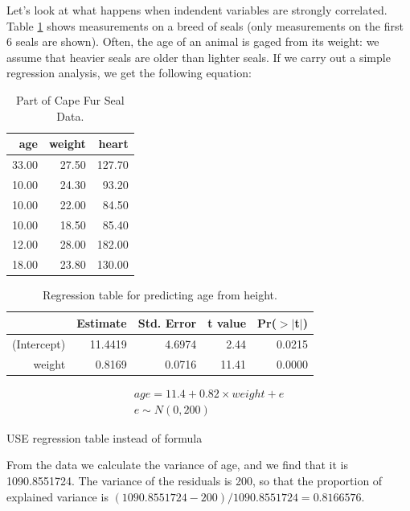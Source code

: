 \documentclass[]{report}\usepackage[]{graphicx}\usepackage[]{color}
\begin{document}
Let's look at what happens when indendent variables are strongly correlated. Table \ref{tab:multi_2} shows measurements on a breed of seals (only measurements on the first 6 seals are shown). Often, the age of an animal is gaged from its weight: we assume that heavier seals are older than lighter seals. If we carry out a simple regression analysis, we get the following equation:


\begin{table}[ht]
\centering
\caption{Part of Cape Fur Seal Data.} 
\label{tab:multi_2}
\begin{tabular}{rrr}
  \hline
age & weight & heart \\ 
  \hline
33.00 & 27.50 & 127.70 \\ 
  10.00 & 24.30 & 93.20 \\ 
  10.00 & 22.00 & 84.50 \\ 
  10.00 & 18.50 & 85.40 \\ 
  12.00 & 28.00 & 182.00 \\ 
  18.00 & 23.80 & 130.00 \\ 
   \hline
\end{tabular}
\end{table}



\begin{table}[ht]
\centering
\caption{Regression table for predicting age from height.} 
\label{tab:multi_2a}
\begin{tabular}{rrrrr}
  \hline
 & Estimate & Std. Error & t value & Pr($>$$|$t$|$) \\ 
  \hline
(Intercept) & 11.4419 & 4.6974 & 2.44 & 0.0215 \\ 
  weight & 0.8169 & 0.0716 & 11.41 & 0.0000 \\ 
   \hline
\end{tabular}
\end{table}



\begin{eqnarray}
age = 11.4 + 0.82 \times  weight + e \\
e \sim N(0, 200)
\end{eqnarray}




USE regression table instead of formula




From the data we calculate the variance of age, and we find that it is 1090.8551724. The variance of the residuals is 200, so that the proportion of explained variance is $(1090.8551724-200)/1090.8551724  = 0.8166576$.
\end{document}
